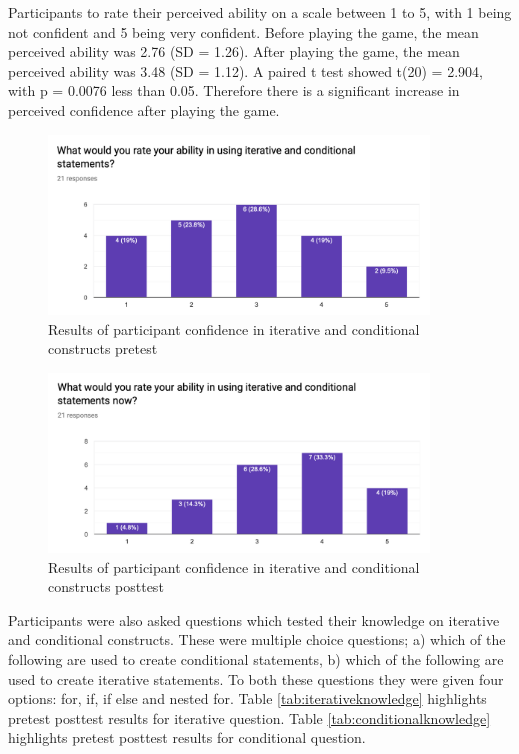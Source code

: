 \documentclass[a4paper,11.5pt]{report}
\numberwithin{figure}{section}
\numberwithin{table}{section}
\numberwithin{equation}{section}
\numberwithin{equation}{section}
\begin{document}
Participants to rate their perceived ability on a scale between 1 to 5, with 1 being not confident and 5 being very confident. Before playing the game, the mean perceived ability was 2.76 (SD = 1.26). After playing the game, the mean perceived ability was 3.48 (SD = 1.12). A paired t test showed t(20) = 2.904, with p = 0.0076 less than 0.05. Therefore there is a significant increase in perceived confidence after playing the game.


\begin{figure}[H]
 \centering
    \includegraphics[width=0.9\textwidth]{preability}
       \captionsetup{justification=centering}
\caption{Results of participant confidence in iterative and conditional constructs pretest}
\label{fig:preability}
\end{figure}

\begin{figure}[H]
 \centering
    \includegraphics[width=0.9\textwidth]{postability}
       \captionsetup{justification=centering}
\caption{Results of participant confidence in iterative and conditional constructs posttest}
\label{fig:postability}
\end{figure}


Participants were also asked questions which tested their knowledge on iterative and conditional constructs. These were multiple choice questions; a) which of the following are used to create conditional statements, b) which of the following are used to create iterative statements. To both these questions they were given four options: for, if, if else and nested for. Table \ref{tab:iterativeknowledge} highlights pretest posttest results for iterative question. Table \ref{tab:conditionalknowledge} highlights pretest posttest results for conditional question.
\end{document}

